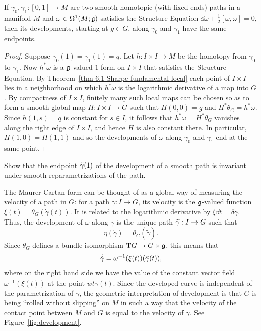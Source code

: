 \begin{thm}\label{thm 7.7 Sharpe}
    If $\gamma_0,\gamma_1:[0,1]\to M$ are two smooth homotopic (with fixed ends) paths in a manifold $M$ and $\omega\in \Omega^1(M;\mathfrak{g})$ satisfies the Structure Equation $\dd \omega+\frac 12[\omega,\omega]=0$, then its developments, starting at $g\in G$, along $\gamma_0$ and $\gamma_1$ have the same endpoints.
\end{thm}
\begin{proof}
    Suppose $\gamma_0(1)=\gamma_1(1)=q$. Let $h:I\times I\to M$ be the homotopy from $\gamma_0$ to $\gamma_1$. Now $h^\ast\omega$ is a $\mathfrak{g}$-valued $1$-form on $I\times I$ that satisfies the Structure Equation.  By Theorem~\ref{thm 6.1 Sharpe fundamental local} each point of $I\times I$ lies in a neighborhood on which $h^\ast\omega$ is the logarithmic derivative of a map into $G$. By compactness of $I\times I$, finitely many such local maps can be chosen so as to form a smooth global map $H:I\times I\to G$ such that $H(0,0)=g$ and $H^\ast\theta_G=h^\ast\omega$. Since $h(1,s)=q$ is constant for $s\in I$, it follows that $h^\ast\omega=H^\ast\theta_G$ vanishes along the right edge of $I\times I$, and hence $H$ is also constant there. In particular, $H(1,0)=H(1,1)$ and so the developments of $\omega$ along $\gamma_0$ and $\gamma_1$ end at the same point.
\end{proof}

\begin{xca}
    Show that the endpoint $\wt{\gamma}(1)$ of the development of a smooth path is invariant under smooth reparametrizations of the path.
\end{xca}

\begin{rem}
    The Maurer-Cartan form can be thought of as a global way of measuring the velocity of a path in $G$: for a path $\gamma:I\to G$, its velocity is the $\mathfrak{g}$-valued function $\xi(t)=\theta_G(\dot\gamma(t))$. It is related to the logarithmic derivative by $\xi\dd t=\delta\gamma$. Thus, the development of $\omega$ along $\gamma$ is the unique path $\wt\gamma:I\to G$ such that 
    \[\eta(\dot\gamma)=\theta_G(\dot{\tilde\gamma}).\]
    Since $\theta_G$ defines a bundle isomorphism $\mathrm{T} G\to G\times\mathfrak{g}$, this means that 
    \[\dot{\tilde\gamma}=\omega^{-1}(\xi(t))(\wt\gamma(t)),\]
    where on the right hand side we have the value of the constant vector field $\omega^{-1}(\xi(t))$ at the point $wt\gamma(t)$. Since the developed curve is independent of the parametrization of $\gamma$, the geometric interpretation of development is that $G$ is being ``rolled without slipping'' on $M$ in such a way that the velocity of the contact point between $M$ and $G$ is equal to the velocity of $\gamma$. See Figure~\ref{fig:development}.
\end{rem}

